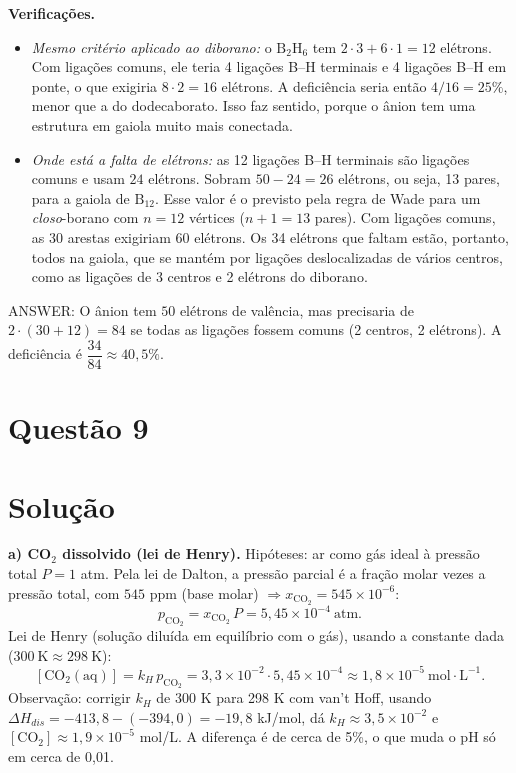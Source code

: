 \documentclass{article}%
\begin{document}
\medskip
\textbf{Verificações.}
\begin{itemize}
\item \emph{Mesmo critério aplicado ao diborano:} o $\mathrm{B_2H_6}$ tem $2\cdot 3 + 6\cdot 1 = 12$ elétrons. Com ligações comuns, ele teria 4 ligações B--H terminais e 4 ligações B--H em ponte, o que exigiria $8\cdot 2 = 16$ elétrons. A deficiência seria então $4/16 = 25\%$, menor que a do dodecaborato. Isso faz sentido, porque o ânion tem uma estrutura em gaiola muito mais conectada.
\item \emph{Onde está a falta de elétrons:} as 12 ligações B--H terminais são ligações comuns e usam $24$ elétrons. Sobram $50 - 24 = 26$ elétrons, ou seja, 13 pares, para a gaiola de $\mathrm{B_{12}}$. Esse valor é o previsto pela regra de Wade para um \emph{closo}-borano com $n = 12$ vértices ($n+1 = 13$ pares). Com ligações comuns, as 30 arestas exigiriam $60$ elétrons. Os 34 elétrons que faltam estão, portanto, todos na gaiola, que se mantém por ligações deslocalizadas de vários centros, como as ligações de 3 centros e 2 elétrons do diborano.
\end{itemize}

\medskip
ANSWER: O ânion tem $50$ elétrons de valência, mas precisaria de $2\cdot(30+12) = 84$ se todas as ligações fossem comuns (2 centros, 2 elétrons). A deficiência é $\dfrac{34}{84} \approx 40{,}5\%$.%
\newpage%
\section*{Questão 9}

\section*{Solução}

\textbf{a) CO$_2$ dissolvido (lei de Henry).}
Hipóteses: ar como gás ideal à pressão total $P=1$ atm. Pela lei de Dalton, a pressão parcial é a fração molar vezes a pressão total, com $545$ ppm (base molar) $\Rightarrow x_{\mathrm{CO_2}}=545\times10^{-6}$:
\[
p_{\mathrm{CO_2}}=x_{\mathrm{CO_2}}\,P=5{,}45\times10^{-4}\ \text{atm}.
\]
Lei de Henry (solução diluída em equilíbrio com o gás), usando a constante dada ($300\ \text{K}\approx 298\ \text{K}$):
\[
[\mathrm{CO_2(aq)}]=k_H\,p_{\mathrm{CO_2}}=3{,}3\times10^{-2}\cdot5{,}45\times10^{-4}\approx 1{,}8\times10^{-5}\ \text{mol}\cdot\text{L}^{-1}.
\]
Observação: corrigir $k_H$ de 300 K para 298 K com van't Hoff, usando $\Delta H_{dis}=-413{,}8-(-394{,}0)=-19{,}8$ kJ/mol, dá $k_H\approx3{,}5\times10^{-2}$ e $[\mathrm{CO_2}]\approx1{,}9\times10^{-5}$ mol/L. A diferença é de cerca de 5\%, o que muda o pH só em cerca de 0,01.
\end{document}
